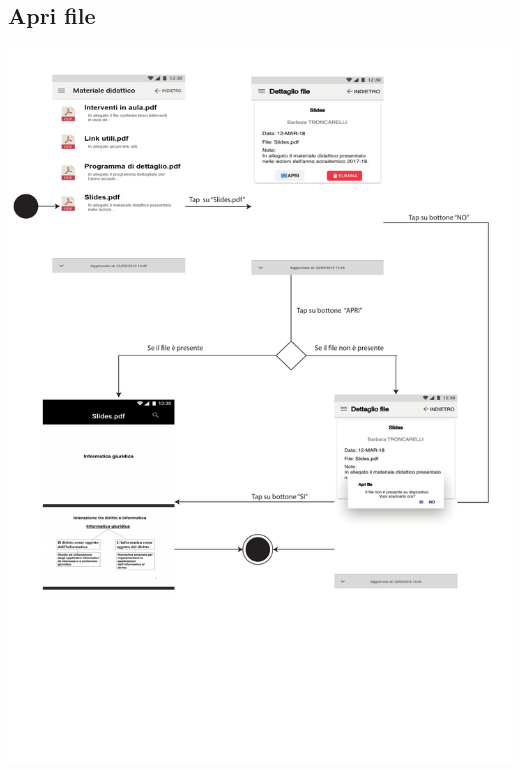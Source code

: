 \subsection{Apri file}
\begin{center}
	\includegraphics[width=6in]{imgs/gruppo1/activity_diagrams/AD16_apri_file.pdf}
\end{center}
\newpage


